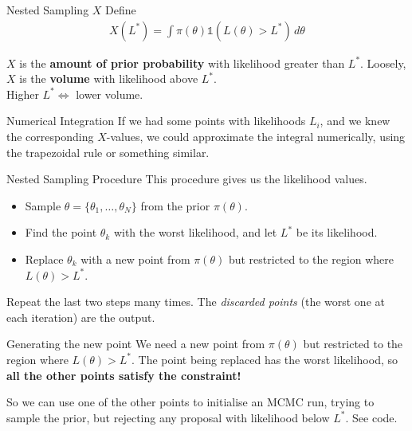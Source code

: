 \documentclass{beamer}
\begin{document}
\begin{frame}{Nested Sampling $X$}
\vspace{-20pt}
Define
\begin{eqnarray*}
X(L^*) = \int \pi(\theta) \mathds{1}\left(L(\theta) > L^*\right)\, d\theta
\end{eqnarray*}

\vspace{10pt}

$X$ is the {\bf amount of prior probability} with likelihood greater than $L^*$.
Loosely, $X$ is the {\bf volume} with likelihood above $L^*$.\\
Higher $L^* \Leftrightarrow$ lower volume.
\end{frame}
\begin{frame}{Numerical Integration}
If we had some points with likelihoods $L_i$, and we knew the corresponding
$X$-values, we could approximate the integral numerically, using the
trapezoidal rule or something similar.
\end{frame}
\begin{frame}{Nested Sampling Procedure}
This procedure gives us the likelihood values. \\

\begin{itemize}
	\item Sample $\theta=\{\theta_{1}, \ldots , \theta_{N}\}$ from the prior $\pi(\theta)$.
	\item Find the point $\theta_k$ with the worst
likelihood, and let $L^*$ be its likelihood.
	\item Replace $\theta_{k}$ with a new point from $\pi(\theta)$ but restricted to the region where $L(\theta)>L^*$.
\end{itemize}

Repeat the last two steps many times.
The \textit{discarded points} (the worst one at each iteration) are the output.
\end{frame}


\begin{frame}[t]{Generating the new point}
We need a new point from $\pi(\theta)$ but restricted to the region where $L(\theta)>L^*$. The point being replaced has the worst likelihood, so
{\bf all the other points satisfy the constraint!}
\vspace{20pt}

So we can use one of the other points to initialise an MCMC run, trying to
sample the prior, but rejecting any proposal with likelihood below $L^*$.
See code.
\end{frame}
\end{document}
